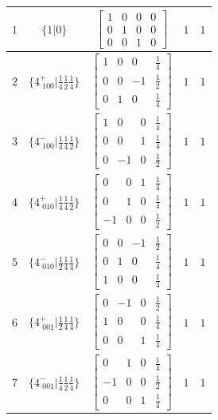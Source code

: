 \documentclass[fleqn,8pt]{jsarticle}
\begin{document}
\begin{longtable}{ccccc}
$ 1 $ & $ \{1|0\} $ & $ \begin{bmatrix} 1 & 0 & 0 & 0 \\ 0 & 1 & 0 & 0 \\ 0 & 0 & 1 & 0 \end{bmatrix} $ & $ 1 $ & $ 1 $ \\ \hline
$ 2 $ & $ \{4^{+}_{\,\,100}|\frac{1}{4} \frac{1}{2} \frac{1}{4}\} $ & $ \begin{bmatrix} 1 & 0 & 0 & \frac{1}{4} \\ 0 & 0 & -1 & \frac{1}{2} \\ 0 & 1 & 0 & \frac{1}{4} \end{bmatrix} $ & $ 1 $ & $ 1 $ \\ \hline
$ 3 $ & $ \{4^{-}_{\,\,100}|\frac{1}{4} \frac{1}{4} \frac{1}{2}\} $ & $ \begin{bmatrix} 1 & 0 & 0 & \frac{1}{4} \\ 0 & 0 & 1 & \frac{1}{4} \\ 0 & -1 & 0 & \frac{1}{2} \end{bmatrix} $ & $ 1 $ & $ 1 $ \\ \hline
$ 4 $ & $ \{4^{+}_{\,\,010}|\frac{1}{4} \frac{1}{4} \frac{1}{2}\} $ & $ \begin{bmatrix} 0 & 0 & 1 & \frac{1}{4} \\ 0 & 1 & 0 & \frac{1}{4} \\ -1 & 0 & 0 & \frac{1}{2} \end{bmatrix} $ & $ 1 $ & $ 1 $ \\ \hline
$ 5 $ & $ \{4^{-}_{\,\,010}|\frac{1}{2} \frac{1}{4} \frac{1}{4}\} $ & $ \begin{bmatrix} 0 & 0 & -1 & \frac{1}{2} \\ 0 & 1 & 0 & \frac{1}{4} \\ 1 & 0 & 0 & \frac{1}{4} \end{bmatrix} $ & $ 1 $ & $ 1 $ \\ \hline
$ 6 $ & $ \{4^{+}_{\,\,001}|\frac{1}{2} \frac{1}{4} \frac{1}{4}\} $ & $ \begin{bmatrix} 0 & -1 & 0 & \frac{1}{2} \\ 1 & 0 & 0 & \frac{1}{4} \\ 0 & 0 & 1 & \frac{1}{4} \end{bmatrix} $ & $ 1 $ & $ 1 $ \\ \hline
$ 7 $ & $ \{4^{-}_{\,\,001}|\frac{1}{4} \frac{1}{2} \frac{1}{4}\} $ & $ \begin{bmatrix} 0 & 1 & 0 & \frac{1}{4} \\ -1 & 0 & 0 & \frac{1}{2} \\ 0 & 0 & 1 & \frac{1}{4} \end{bmatrix} $ & $ 1 $ & $ 1 $ \\ \hline

\end{longtable}
\end{document}
